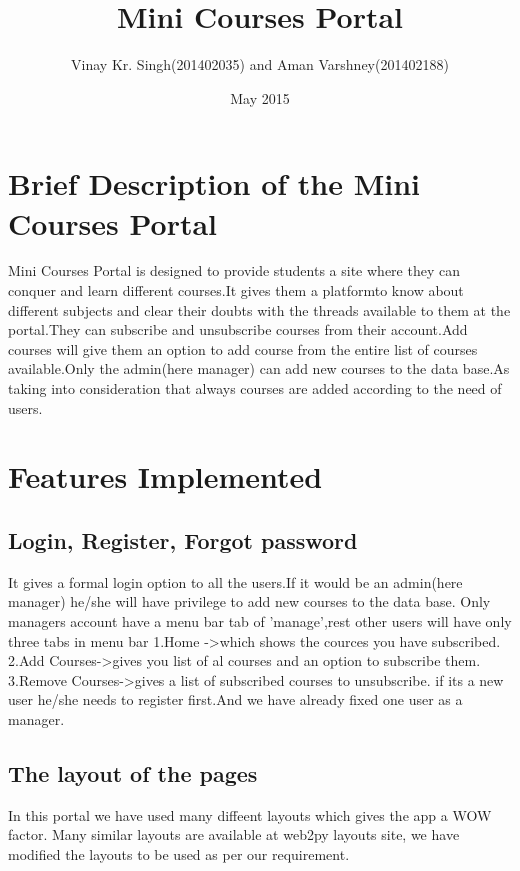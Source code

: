 \documentclass{article}
\title{Mini Courses Portal}
\author{Vinay Kr. Singh(201402035) and Aman Varshney(201402188)}
\date{May 2015}
\begin{document}
\maketitle

\section{Brief Description of the Mini Courses Portal}

\large{Mini Courses Portal is designed to provide students a site where they can conquer and learn different courses.It gives them a platformto know about different subjects and clear their doubts with the threads available to them at the portal.They can subscribe and unsubscribe courses from their account.Add courses will give them an option to add course from the entire list of courses available.Only the admin(here manager) can add new courses to the data base.As taking into consideration that always courses are added according to the need of users.}


\section{Features Implemented}

\subsection{Login, Register, Forgot password}

\large{It gives a formal login option to all the users.If it would be an admin(here manager) he/she will have privilege to add new courses to the data base. Only managers account have a menu bar tab of 'manage',rest other users will have only three tabs in menu bar 1.Home ->which shows the cources you have subscribed.
2.Add Courses->gives you list of al courses and an option to subscribe them.
3.Remove Courses->gives a list of subscribed courses to unsubscribe.
if its a new user he/she needs to register first.And we have already fixed one user as a manager.}
\subsection{The layout of the pages}

\large{In this portal we have used many diffeent layouts which gives the app a WOW factor. Many similar layouts are available at web2py layouts site, we have modified the layouts to be used as per our requirement.}
\end{document}
